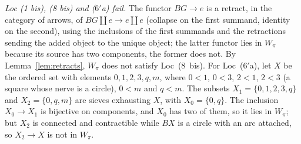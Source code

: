 \documentclass[11pt,a4paper]{article}
\theoremstyle{definition}
\newcommand{\Wpi}{W_{\pi}}
\begin{document}
\emph{Loc (1 bis), (8 bis) and ($6'$a) fail.} The functor $BG\to e$ is a retract, in the
category of arrows, of $BG\amalg e\to e\amalg e$ (collapse on the first summand, identity on
the second), using the inclusions of the first summands and the retractions sending the
added object to the unique object; the latter functor lies in $\Wpi$ because its source has two
components, the former does not. By Lemma~\ref{lem:retracts}, $\Wpi$ does not satisfy
Loc~(8~bis). For Loc~($6'$a), let $X$ be the ordered set with elements $0,1,2,3,q,m$, where
$0<1$, $0<3$, $2<1$, $2<3$ (a square whose nerve is a circle), $0<m$ and $q<m$. The subsets
$X_1=\{0,1,2,3,q\}$ and $X_2=\{0,q,m\}$ are sieves exhausting $X$, with $X_0=\{0,q\}$. The
inclusion $X_0\to X_1$ is bijective on components, and $X_0$ has two of them, so it lies in
$\Wpi$; but $X_2$ is connected and contractible while $BX$ is a circle with an arc attached,
so $X_2\to X$ is not in $\Wpi$.
\end{document}
